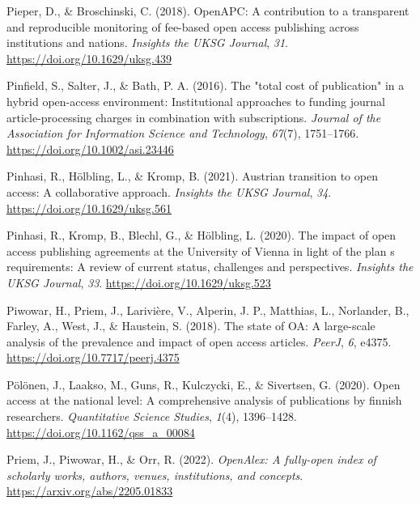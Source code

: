 \documentclass[a4paper,man,floatsintext,longtable,noextraspace,12pt]{apa6}
\newenvironment{CSLReferences}%
  {}%
  {\par}
\begin{document}
\begin{CSLReferences}{1}{0}
\leavevmode{}%
Pieper, D., \& Broschinski, C. (2018). {OpenAPC}: A contribution to a
transparent and reproducible monitoring of fee-based open access
publishing across institutions and nations. \emph{Insights the {UKSG}
Journal}, \emph{31}. \url{https://doi.org/10.1629/uksg.439}

\leavevmode{}%
Pinfield, S., Salter, J., \& Bath, P. A. (2016). The "total cost of
publication" in a hybrid open-access environment: Institutional
approaches to funding journal article-processing charges in combination
with subscriptions. \emph{Journal of the Association for Information
Science and Technology}, \emph{67}(7), 1751--1766.
\url{https://doi.org/10.1002/asi.23446}

\leavevmode{}%
Pinhasi, R., Hölbling, L., \& Kromp, B. (2021). Austrian transition to
open access: A collaborative approach. \emph{Insights the UKSG Journal},
\emph{34}. \url{https://doi.org/10.1629/uksg.561}

\leavevmode{}%
Pinhasi, R., Kromp, B., Blechl, G., \& Hölbling, L. (2020). The impact
of open access publishing agreements at the {University of Vienna} in
light of the plan s requirements: A review of current status, challenges
and perspectives. \emph{Insights the UKSG Journal}, \emph{33}.
\url{https://doi.org/10.1629/uksg.523}

\leavevmode{}%
Piwowar, H., Priem, J., Larivière, V., Alperin, J. P., Matthias, L.,
Norlander, B., Farley, A., West, J., \& Haustein, S. (2018). The state
of {OA}: A large-scale analysis of the prevalence and impact of open
access articles. \emph{{PeerJ}}, \emph{6}, e4375.
\url{https://doi.org/10.7717/peerj.4375}

\leavevmode{}%
Pölönen, J., Laakso, M., Guns, R., Kulczycki, E., \& Sivertsen, G.
(2020). Open access at the national level: A comprehensive analysis of
publications by finnish researchers. \emph{Quantitative Science
Studies}, \emph{1}(4), 1396--1428.
\url{https://doi.org/10.1162/qss_a_00084}

\leavevmode{}%
Priem, J., Piwowar, H., \& Orr, R. (2022). \emph{OpenAlex: A fully-open
index of scholarly works, authors, venues, institutions, and concepts}.
\url{https://arxiv.org/abs/2205.01833}


\end{CSLReferences}
\end{document}
